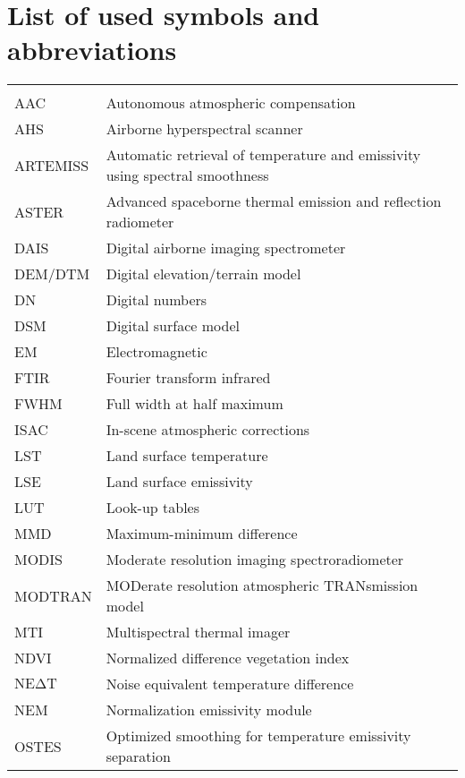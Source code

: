 \chapter*{List of used symbols and abbreviations}

\vspace{-1.5cm}

\begin{table}[h]
\begin{tabular}{ll}
\hspace{3cm} & \hspace{10cm} \\
AAC & Autonomous atmospheric compensation \\
AHS & Airborne hyperspectral scanner \\
ARTEMISS & Automatic retrieval of temperature and emissivity using spectral smoothness \\
ASTER & Advanced spaceborne thermal emission and reflection radiometer \\
DAIS & Digital airborne imaging spectrometer \\
DEM/DTM & Digital elevation/terrain  model \\
DN & Digital numbers \\
DSM & Digital surface model \\
EM & Electromagnetic \\
FTIR & Fourier transform infrared \\
FWHM & Full width at half maximum \\
ISAC & In-scene atmospheric corrections \\
LST & Land surface temperature \\
LSE & Land surface emissivity \\
LUT & Look-up tables \\
MMD & Maximum-minimum difference \\
MODIS & Moderate resolution imaging spectroradiometer \\
MODTRAN & MODerate resolution atmospheric TRANsmission model \\
MTI & Multispectral thermal imager \\
NDVI & Normalized difference vegetation index \\
$\mathrm{NE\Delta T}$ & Noise equivalent temperature difference \\
NEM & Normalization emissivity module \\
OSTES & Optimized smoothing for temperature emissivity separation \\

\end{tabular}
\end{table}
